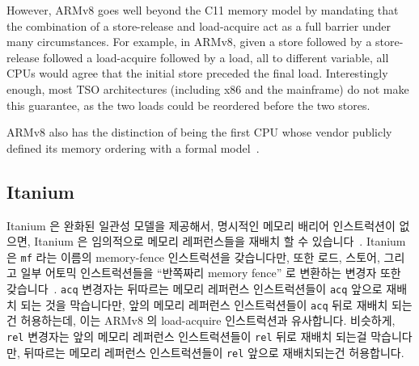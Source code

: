 However, ARMv8 goes well beyond the C11 memory model by mandating that
the combination of a store-release and load-acquire act as a full
barrier under many circumstances.
For example, in ARMv8, given a store followed by a store-release followed
a load-acquire followed by a load, all to different variable, all CPUs
would agree that the initial store preceded the final load.
Interestingly enough, most TSO architectures (including x86 and the
mainframe) do not make this guarantee, as the two loads could be
reordered before the two stores.

ARMv8 also has the distinction of being the first CPU whose vendor publicly
defined its memory ordering with a formal model~\cite{ARMv8A:2017}.
\fi

\subsection{Itanium}

Itanium 은 완화된 일관성 모델을 제공해서, 명시적인 메모리 배리어 인스트럭션이
없으면, Itanium 은 임의적으로 메모리 레퍼런스들을 재배치 할 수
있습니다~\cite{IntelItanium02v2}.
Itanium 은 {\tt mf} 라는 이름의 memory-fence 인스트럭션을 갖습니다만, 또한
로드, 스토어, 그리고 일부 어토믹 인스트럭션들을 ``반쪽짜리 memory fence'' 로
변환하는 변경자 또한 갖습니다~\cite{IntelItanium02v2}.
{\tt acq} 변경자는 뒤따르는 메모리 레퍼런스 인스트럭션들이 {\tt acq} 앞으로
재배치 되는 것을 막습니다만, 앞의 메모리 레퍼런스 인스트럭션들이 {\tt acq} 뒤로
재배치 되는건 허용하는데, 이는 ARMv8 의 load-acquire 인스트럭션과 유사합니다.
비슷하게, {\tt rel} 변경자는 앞의 메모리 레퍼런스 인스트럭션들이 {\tt rel} 뒤로
재배치 되는걸 막습니다만, 뒤따르는 메모리 레퍼런스 인스트럭션들이 {\tt rel}
앞으로 재배치되는건 허용합니다.

